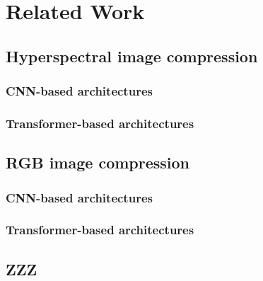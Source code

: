 \chapter{Related Work\label{cha:chapter2}}
\section{Hyperspectral image compression \label{sec:ch2yyy}}
\subsection{CNN-based architectures}
\subsection{Transformer-based architectures}
\section{RGB image compression \label{sec:ch2xxx}}
\subsection{CNN-based architectures}
\subsection{Transformer-based architectures}
\section{ZZZ \label{sec:ch2zzz}}